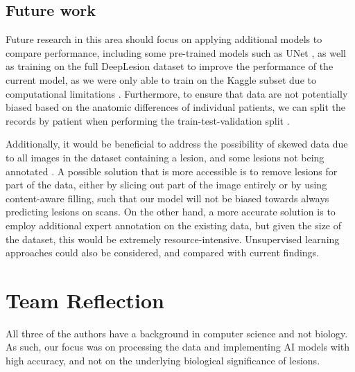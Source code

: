 \subsection{Future work}
Future research in this area should focus on applying additional models to compare performance, including some pre-trained models such as UNet \cite{unet}, as well as training on the full DeepLesion dataset to improve the performance of the current model, as we were only able to train on the Kaggle subset due to computational limitations \cite{kaggle}. Furthermore, to ensure that data are not potentially biased based on the anatomic differences of individual patients, we can split the records by patient when performing the train-test-validation split \cite{chollet_deep_learning}. 

Additionally, it would be beneficial to address the possibility of skewed data due to all images in the dataset containing a lesion, and some lesions not being annotated \cite{deeplesion}. A possible solution that is more accessible is to remove lesions for part of the data, either by slicing out part of the image entirely or by using content-aware filling, such that our model will not be biased towards always predicting lesions on scans. On the other hand, a more accurate solution is to employ additional expert annotation on the existing data, but given the size of the dataset, this would be extremely resource-intensive. Unsupervised learning approaches could also be considered, and compared with current findings.


\section*{Team Reflection}
All three of the authors have a background in computer science and not biology. As such, our focus was on processing the data and implementing AI models with high accuracy, and not on the underlying biological significance of lesions.




\vfill


%
%

